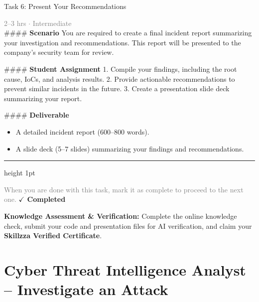 \documentclass[10pt,a4paper]{article}
\begin{document}
\begin{taskbox}{Task 6: Present Your Recommendations}

    {\small \textcolor{gray}{2--3 hrs $\cdot$ Intermediate}}\\[12pt]

    \#\#\#\# \textbf{Scenario}  
You are required to create a final incident report summarizing your investigation and recommendations. This report will be presented to the company’s security team for review.

\#\#\#\# \textbf{Student Assignment}  
1. Compile your findings, including the root cause, IoCs, and analysis results.  
2. Provide actionable recommendations to prevent similar incidents in the future.  
3. Create a presentation slide deck summarizing your report.  

\#\#\#\# \textbf{Deliverable}  
\begin{itemize}
    \item A detailed incident report (600–800 words).  
    \item A slide deck (5–7 slides) summarizing your findings and recommendations.\par
\end{itemize}

    \vspace{16pt}

    \textcolor{cardBorder}{\hrule height 1pt}\vspace{8pt}

    \small \textcolor{gray}{When you are done with this task, mark it as complete to proceed to the next one.} \hfill \textbf{\textcolor{brandDark}{$\checkmark$ Completed}}

\end{taskbox}

\begin{completionbox}
    \textbf{Knowledge Assessment \& Verification:} Complete the online knowledge check, submit your code and presentation files for AI verification, and claim your \textbf{Skillzza Verified Certificate}.
\end{completionbox}

\newpage




\section*{Cyber Threat Intelligence Analyst – Investigate an Attack}
\end{document}
